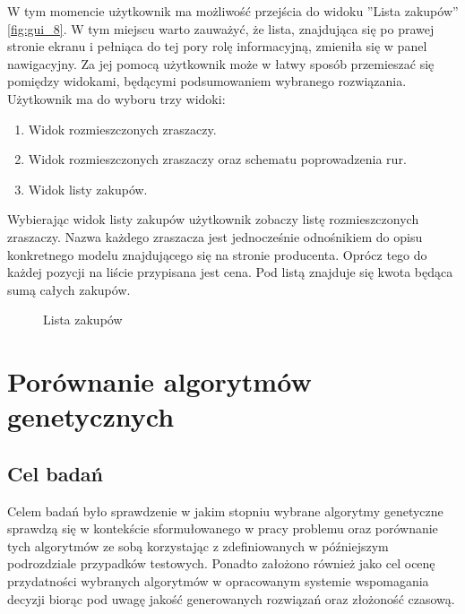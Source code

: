 \documentclass[twoside]{iisthesis}
\begin{document}
W tym momencie użytkownik ma możliwość przejścia do widoku ''Lista zakupów'' \eqref{fig:gui_8}. W tym miejscu warto zauważyć, że lista, znajdująca się po prawej stronie ekranu i pełniąca do tej pory rolę informacyjną, zmieniła się w panel nawigacyjny. Za jej pomocą użytkownik może w łatwy sposób przemieszać się pomiędzy widokami, będącymi podsumowaniem wybranego rozwiązania. Użytkownik ma do wyboru trzy widoki:\\
\begin{enumerate}
	\item Widok rozmieszczonych zraszaczy.
	\item Widok rozmieszczonych zraszaczy oraz schematu poprowadzenia rur.
	\item Widok listy zakupów.\\
\end{enumerate}

Wybierając widok listy zakupów użytkownik zobaczy listę rozmieszczonych zraszaczy. Nazwa każdego zraszacza jest jednocześnie odnośnikiem do opisu konkretnego modelu znajdującego się na stronie producenta. Oprócz tego do każdej pozycji na liście przypisana jest cena. Pod listą znajduje się kwota będąca sumą całych zakupów.
\begin{figure}[!htb]
	\centering
	\caption{Lista zakupów}
	\label{fig:gui_8}
\end{figure}
\section{Porównanie algorytmów genetycznych}
\subsection{Cel badań}
Celem badań było sprawdzenie w jakim stopniu wybrane algorytmy genetyczne sprawdzą się w kontekście sformułowanego w pracy problemu oraz porównanie tych algorytmów ze sobą korzystając z zdefiniowanych w późniejszym podrozdziale przypadków testowych. Ponadto założono również jako cel ocenę przydatności wybranych algorytmów w opracowanym systemie wspomagania decyzji biorąc pod uwagę jakość generowanych rozwiązań oraz złożoność czasową.
\end{document}
